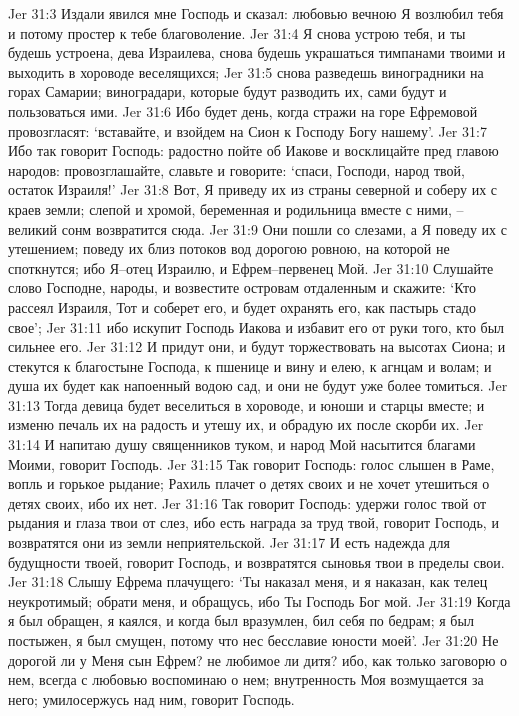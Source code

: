 Jer 31:3  Издали явился мне Господь и сказал: любовью вечною Я возлюбил тебя и потому простер к тебе благоволение.
Jer 31:4  Я снова устрою тебя, и ты будешь устроена, дева Израилева, снова будешь украшаться тимпанами твоими и выходить в хороводе веселящихся;
Jer 31:5  снова разведешь виноградники на горах Самарии; виноградари, которые будут разводить их, сами будут и пользоваться ими.
Jer 31:6  Ибо будет день, когда стражи на горе Ефремовой провозгласят: `вставайте, и взойдем на Сион к Господу Богу нашему'.
Jer 31:7  Ибо так говорит Господь: радостно пойте об Иакове и восклицайте пред главою народов: провозглашайте, славьте и говорите: `спаси, Господи, народ твой, остаток Израиля!'
Jer 31:8  Вот, Я приведу их из страны северной и соберу их с краев земли; слепой и хромой, беременная и родильница вместе с ними, --великий сонм возвратится сюда.
Jer 31:9  Они пошли со слезами, а Я поведу их с утешением; поведу их близ потоков вод дорогою ровною, на которой не споткнутся; ибо Я--отец Израилю, и Ефрем--первенец Мой.
Jer 31:10  Слушайте слово Господне, народы, и возвестите островам отдаленным и скажите: `Кто рассеял Израиля, Тот и соберет его, и будет охранять его, как пастырь стадо свое';
Jer 31:11  ибо искупит Господь Иакова и избавит его от руки того, кто был сильнее его.
Jer 31:12  И придут они, и будут торжествовать на высотах Сиона; и стекутся к благостыне Господа, к пшенице и вину и елею, к агнцам и волам; и душа их будет как напоенный водою сад, и они не будут уже более томиться.
Jer 31:13  Тогда девица будет веселиться в хороводе, и юноши и старцы вместе; и изменю печаль их на радость и утешу их, и обрадую их после скорби их.
Jer 31:14  И напитаю душу священников туком, и народ Мой насытится благами Моими, говорит Господь.
Jer 31:15  Так говорит Господь: голос слышен в Раме, вопль и горькое рыдание; Рахиль плачет о детях своих и не хочет утешиться о детях своих, ибо их нет.
Jer 31:16  Так говорит Господь: удержи голос твой от рыдания и глаза твои от слез, ибо есть награда за труд твой, говорит Господь, и возвратятся они из земли неприятельской.
Jer 31:17  И есть надежда для будущности твоей, говорит Господь, и возвратятся сыновья твои в пределы свои.
Jer 31:18  Слышу Ефрема плачущего: `Ты наказал меня, и я наказан, как телец неукротимый; обрати меня, и обращусь, ибо Ты Господь Бог мой.
Jer 31:19  Когда я был обращен, я каялся, и когда был вразумлен, бил себя по бедрам; я был постыжен, я был смущен, потому что нес бесславие юности моей'.
Jer 31:20  Не дорогой ли у Меня сын Ефрем? не любимое ли дитя? ибо, как только заговорю о нем, всегда с любовью воспоминаю о нем; внутренность Моя возмущается за него; умилосержусь над ним, говорит Господь.
